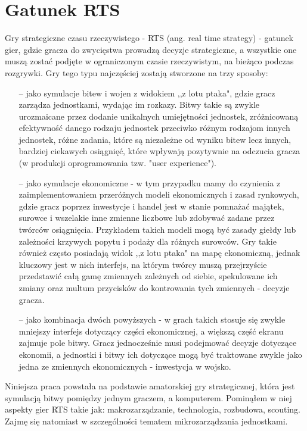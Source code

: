 \documentclass[12pt]{report}
\begin{document}
\section {Gatunek RTS}
Gry strategiczne czasu rzeczywistego - RTS (ang. real time strategy) - gatunek gier, gdzie gracza do zwycięstwa prowadzą decyzje strategiczne, a wszystkie one muszą zostać podjęte w ograniczonym czasie rzeczywistym, na bieżąco podczas rozgrywki. Gry tego typu najczęściej zostają stworzone na trzy sposoby: 
\begin{itemize}
\item[--] jako symulacje bitew i wojen z widokiem ,,z lotu ptaka", gdzie gracz zarządza jednostkami, wydając im rozkazy. Bitwy takie są zwykle urozmaicane przez dodanie unikalnych umiejętności jednostek, zróżnicowaną efektywność danego rodzaju jednostek przeciwko różnym rodzajom innych jednostek, różne zadania, które są niezależne od wyniku bitew lecz innych, bardziej ciekawych osiągnięć, które wpływają pozytywnie na odczucia gracza (w produkcji oprogramowania tzw. "user experience").
\item[--] jako symulacje ekonomiczne - w tym przypadku mamy do czynienia z zaimplementowaniem przeróżnych modeli ekonomicznych i zasad rynkowych, gdzie gracz poprzez inwestycje i handel jest w stanie pomnażać majątek, surowce i wszelakie inne zmienne liczbowe lub zdobywać zadane przez twórców osiągnięcia. Przykładem takich modeli mogą być zasady giełdy lub zależności krzywych popytu i podaży dla różnych surowców. Gry takie również często posiadają widok ,,z lotu ptaka" na mapę ekonomiczną, jednak kluczowy jest w nich interfejs, na którym twórcy muszą przejrzyście przedstawić całą gamę zmiennych zależnych od siebie, spekulowane ich zmiany oraz multum przycisków do kontrowania tych zmiennych - decyzje gracza.
\item[--] jako kombinacja dwóch powyższych - w grach takich stosuje się zwykle mniejszy interfejs dotyczący części ekonomicznej, a większą część ekranu zajmuje pole bitwy. Gracz jednocześnie musi podejmować decyzje dotyczące ekonomii, a jednostki i bitwy ich dotyczące mogą być traktowane zwykle jako jedna ze zmiennych ekonomicznych - inwestycja w wojsko.
\end{itemize} 
Niniejsza praca powstała na podstawie amatorskiej gry strategicznej, która jest symulacją bitwy pomiędzy jednym graczem, a komputerem. Pominąłem w niej aspekty gier RTS takie jak: makrozarządzanie, technologia, rozbudowa, scouting. Zajmę się natomiast w szczególności tematem mikrozarządzania jednostkami. 
\end{document}
